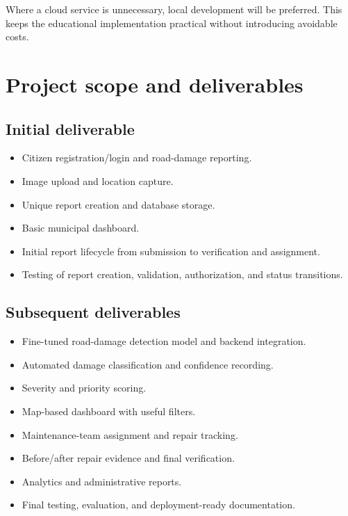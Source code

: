 \documentclass[11pt,a4paper]{article}
\begin{document}
Where a cloud service is unnecessary, local development will be preferred. This keeps the educational implementation practical without introducing avoidable costs.

\section{Project scope and deliverables}

\subsection{Initial deliverable}

\begin{itemize}[leftmargin=0.6cm]

    \item Citizen registration/login and road-damage reporting.
    \item Image upload and location capture.
    \item Unique report creation and database storage.
    \item Basic municipal dashboard.
    \item Initial report lifecycle from submission to verification and assignment.
    \item Testing of report creation, validation, authorization, and status transitions.

\end{itemize}

\subsection{Subsequent deliverables}

\begin{itemize}[leftmargin=0.6cm]

    \item Fine-tuned road-damage detection model and backend integration.
    \item Automated damage classification and confidence recording.
    \item Severity and priority scoring.
    \item Map-based dashboard with useful filters.
    \item Maintenance-team assignment and repair tracking.
    \item Before/after repair evidence and final verification.
    \item Analytics and administrative reports.
    \item Final testing, evaluation, and deployment-ready documentation.

\end{itemize}
\end{document}
